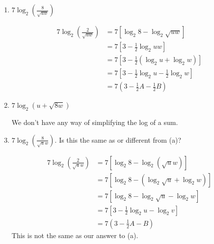 \documentclass{article}
\begin{document}
\begin{enumerate}[resume]
  \begin{enumerate}
  \item


    \begin{problem}[\vfill]
      $\displaystyle 7 \log_2 \left( \frac{8}{\sqrt{uw}}\right)$
    \end{problem}

    \begin{solution}
      \begin{align*}
        7\log_2 \left( \frac{2}{\sqrt{uw}}\right) &= 7\left[ \log_2 8 - \log_2\!
          \sqrt{uw} \right] \\
        &= 7\left[3 - \frac{1}{2} \log_2 uw \right] \\
        &= 7\left[3 - \frac{1}{2} \left( \log_2 u + \log_2 w \right)\right] \\
        &= 7\left[3 - \frac{1}{2} \log_2 u - \frac{1}{2} \log_2 w\right] \\
        &= \boxed{7\left(3 - \frac{1}{2} A - \frac{1}{2} B\right)}
      \end{align*}
    \end{solution}

  \item
    \begin{problem}[\vfill]
      $7 \log_2 \left( u + \sqrt{8w} \right)$
    \end{problem}

    \begin{solution}
      We don't have any way of simplifying the log of a sum.
    \end{solution}

  \item 
    \begin{problem}[\vfill\newpage]
      $\displaystyle 7 \log_2 \left( \frac{8}{\sqrt{u} w}\right)$. Is this the same as or different from (a)?
    \end{problem}

    \begin{solution}
      \begin{align*}
        7\log_2 \left( \frac{2}{\sqrt{u}w}\right) &= 7\left[ \log_2 8 - \log_2\! \left(
          \sqrt{u}w \right)\right] \\
        &= 7\left[ \log_2 8 - \left(\log_2\!
          \sqrt{u} + \log_2 w\right) \right] \\
          &= 7\left[ \log_2 8 - \log_2\!
          \sqrt{u} - \log_2 w \right] \\
        &= 7\left[3 - \frac{1}{2} \log_2 u - \log_2 v\right] \\
        &= \boxed{7\left(3 - \frac{1}{2} A - B\right)}
      \end{align*}
      This is not the same as our answer to (a).
    \end{solution}


\end{enumerate}
\end{enumerate}
\end{document}

